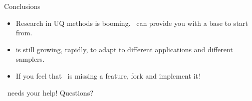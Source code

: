 \begin{frame}{Conclusions}
  \begin{itemize}
  \item Research in UQ methods is booming. \lib~can
    provide you with a base to start from.
  \item \lib is still growing, rapidly, to adapt to
    different applications and different samplers.
  \item If you feel that \lib~is missing a feature, fork \lib and
    implement it!
  \end{itemize}
\end{frame}

\begin{frame}{\lib\ needs your help!}
Questions?
\end{frame}

